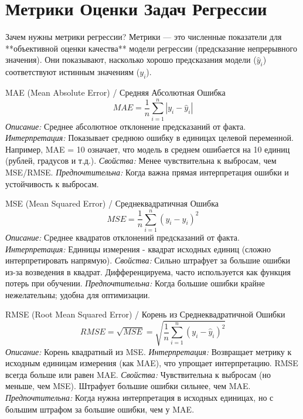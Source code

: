 
\section{Метрики Оценки Задач Регрессии}

\begin{myblock}{Зачем нужны метрики регрессии?}
    Метрики — это численные показатели для **объективной оценки качества** модели регрессии (предсказание непрерывного значения). Они показывают, насколько хорошо предсказания модели ($\hat{y}_i$) соответствуют истинным значениям ($y_i$).
\end{myblock}

\begin{textbox}{{MAE (Mean Absolute Error) / Средняя Абсолютная Ошибка}}
    \[ MAE = \frac{1}{n} \sum_{i=1}^{n} |y_i - \hat{y}_i| \]
    \textit{Описание:} Среднее абсолютное отклонение предсказаний от факта.
    \textit{Интерпретация:} Показывает среднюю ошибку в единицах целевой переменной. Например, MAE = 10 означает, что модель в среднем ошибается на 10 единиц (рублей, градусов и т.д.).
    \textit{Свойства:} Менее чувствительна к выбросам, чем MSE/RMSE.
    \textit{Предпочтительна:} Когда важна прямая интерпретация ошибки и устойчивость к выбросам.
\end{textbox}

\begin{textbox}{{MSE (Mean Squared Error) / Среднеквадратичная Ошибка}}
    \[ MSE = \frac{1}{n} \sum_{i=1}^{n} (y_i - \hat{y}_i)^2 \]
    \textit{Описание:} Среднее квадратов отклонений предсказаний от факта.
    \textit{Интерпретация:} Единицы измерения - квадрат исходных единиц (сложно интерпретировать напрямую).
    \textit{Свойства:} Сильно штрафует за большие ошибки из-за возведения в квадрат. Дифференцируема, часто используется как функция потерь при обучении.
    \textit{Предпочтительна:} Когда большие ошибки крайне нежелательны; удобна для оптимизации.
\end{textbox}

\begin{textbox}{{RMSE (Root Mean Squared Error) / Корень из Среднеквадратичной Ошибки}}
    \[ RMSE = \sqrt{MSE} = \sqrt{\frac{1}{n} \sum_{i=1}^{n} (y_i - \hat{y}_i)^2} \]
    \textit{Описание:} Корень квадратный из MSE.
    \textit{Интерпретация:} Возвращает метрику к исходным единицам измерения (как MAE), что упрощает интерпретацию. RMSE всегда больше или равен MAE.
    \textit{Свойства:} Чувствительна к выбросам (но меньше, чем MSE). Штрафует большие ошибки сильнее, чем MAE.
    \textit{Предпочтительна:} Когда нужна интерпретация в исходных единицах, но с большим штрафом за большие ошибки, чем у MAE.
\end{textbox}

